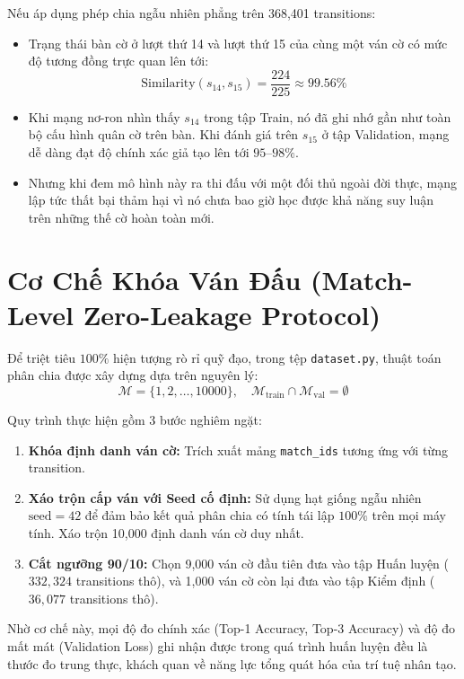 \documentclass[11pt,a4paper]{report}
\begin{document}
Nếu áp dụng phép chia ngẫu nhiên phẳng trên 368,401 transitions:
\begin{itemize}
    \item Trạng thái bàn cờ ở lượt thứ 14 và lượt thứ 15 của cùng một ván cờ có mức độ tương đồng trực quan lên tới:
    \begin{equation}
        \text{Similarity}(s_{14}, s_{15}) = \frac{224}{225} \approx 99.56\%
    \end{equation}
    \item Khi mạng nơ-ron nhìn thấy $s_{14}$ trong tập Train, nó đã ghi nhớ gần như toàn bộ cấu hình quân cờ trên bàn. Khi đánh giá trên $s_{15}$ ở tập Validation, mạng dễ dàng đạt độ chính xác giả tạo lên tới $95\text{--}98\%$.
    \item Nhưng khi đem mô hình này ra thi đấu với một đối thủ ngoài đời thực, mạng lập tức thất bại thảm hại vì nó chưa bao giờ học được khả năng suy luận trên những thế cờ hoàn toàn mới.
\end{itemize}

\section{Cơ Chế Khóa Ván Đấu (Match-Level Zero-Leakage Protocol)}

Để triệt tiêu $100\%$ hiện tượng rò rỉ quỹ đạo, trong tệp \texttt{dataset.py}, thuật toán phân chia được xây dựng dựa trên nguyên lý:
\begin{equation}
    \mathcal{M} = \{1, 2, \dots, 10000\}, \quad \mathcal{M}_{\text{train}} \cap \mathcal{M}_{\text{val}} = \emptyset
\end{equation}

Quy trình thực hiện gồm 3 bước nghiêm ngặt:
\begin{enumerate}
    \item \textbf{Khóa định danh ván cờ:} Trích xuất mảng \texttt{match\_ids} tương ứng với từng transition.
    \item \textbf{Xáo trộn cấp ván với Seed cố định:} Sử dụng hạt giống ngẫu nhiên $\text{seed} = 42$ để đảm bảo kết quả phân chia có tính tái lập $100\%$ trên mọi máy tính. Xáo trộn 10,000 định danh ván cờ duy nhất.
    \item \textbf{Cắt ngưỡng 90/10:} Chọn 9,000 ván cờ đầu tiên đưa vào tập Huấn luyện ($332,324$ transitions thô), và 1,000 ván cờ còn lại đưa vào tập Kiểm định ($36,077$ transitions thô).
\end{enumerate}

Nhờ cơ chế này, mọi độ đo chính xác (Top-1 Accuracy, Top-3 Accuracy) và độ đo mất mát (Validation Loss) ghi nhận được trong quá trình huấn luyện đều là thước đo trung thực, khách quan về năng lực tổng quát hóa của trí tuệ nhân tạo.
\end{document}
